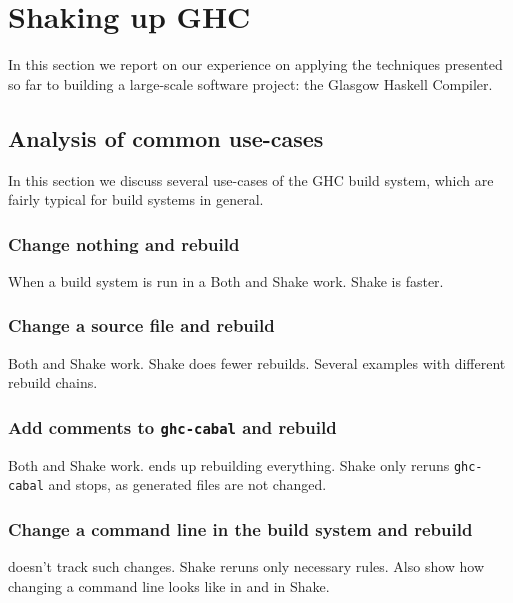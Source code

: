 \section{Shaking up GHC\label{sec:ghc}}

In this section we report on our experience on applying the techniques presented
so far to building a large-scale software project: the Glasgow Haskell Compiler.


\subsection{Analysis of common use-cases}

In this section we discuss several use-cases of the GHC build system, which
are fairly typical for build systems in general.

\subsubsection{Change nothing and rebuild}

When a build system is run in a
Both \make{} and Shake work. Shake is faster.

\subsubsection{Change a source file and rebuild}

Both \make{} and Shake work. Shake does fewer rebuilds. Several examples with
different rebuild chains.

\subsubsection{Add comments to \texttt{ghc-cabal} and rebuild}

Both \make{} and Shake work. \make{} ends up rebuilding everything. Shake only
reruns \texttt{ghc-cabal} and stops, as generated files are not changed.

\subsubsection{Change a command line in the build system and rebuild}

\make{} doesn't track such changes. Shake reruns only necessary rules.
Also show how changing a command line looks like in \make{} and in Shake.

